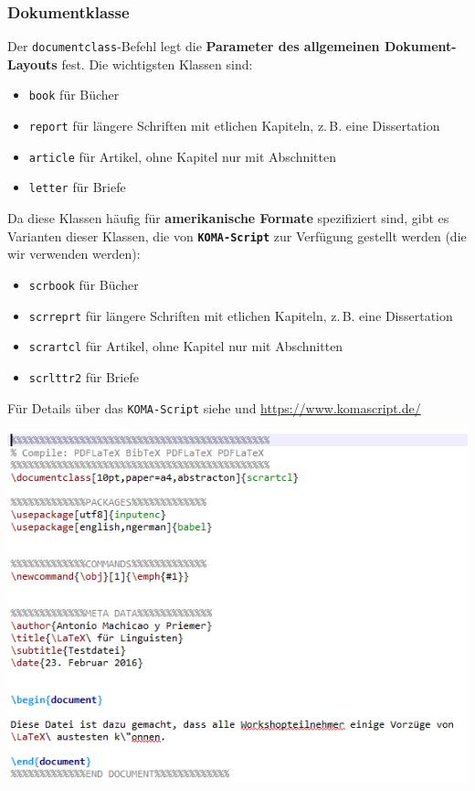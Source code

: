 \begin{frame}[fragile]
\frametitle{Dokumentklasse}

Der \lstinline|documentclass|-Befehl legt die \textbf{Parameter des allgemeinen Dokument-Layouts} fest. Die wichtigsten Klassen sind: 

\begin{itemize}
	\item \texttt{book} für Bücher  
	\item \texttt{report} für längere Schriften mit etlichen Kapiteln, z.\,B. eine Dissertation
	\item \texttt{article} für Artikel, ohne Kapitel nur mit Abschnitten
	\item \texttt{letter} für Briefe
\end{itemize}


\end{frame}


\begin{frame}[fragile]

Da diese Klassen häufig für \textbf{amerikanische Formate}
spezifiziert sind, gibt es Varianten dieser Klassen, die von
\textbf{\texttt{KOMA-Script}} zur Verfügung gestellt werden (die wir verwenden werden):

\begin{itemize}
	\item \texttt{scrbook} für Bücher  
	\item \texttt{scrreprt} für längere Schriften mit etlichen Kapiteln, z.\,B. eine Dissertation
	\item \texttt{scrartcl} für Artikel, ohne Kapitel nur mit Abschnitten
	\item \texttt{scrlttr2} für Briefe
\end{itemize}

Für Details über das \texttt{KOMA-Script} siehe \citet{Kohm&Co13a} und \url{https://www.komascript.de/}
\end{frame}


\begin{frame}[fragile]

\centering
\includegraphics[width=0.9\linewidth]{../../texfiles-beamer/tex-material/WissArb-latex/latexTest2tex}


\end{frame}

